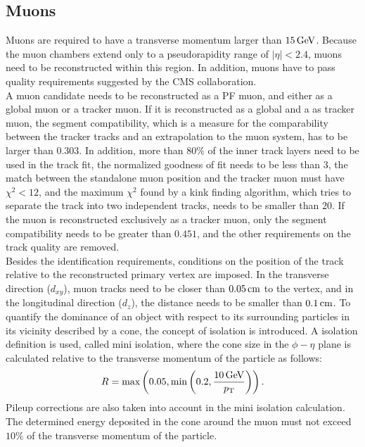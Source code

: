 \subsection{Muons}
Muons are required to have a transverse momentum larger than $15\,\text{Ge\hspace{-.08em}V}$. Because the muon chambers extend only to a pseudorapidity range of $|\eta|<2.4$, muons need to be reconstructed within this region. In addition, muons have to pass quality requirements suggested by the CMS collaboration\cite{MuonIDPerf}.\\
A muon candidate needs to be reconstructed as a PF muon, and either as a global muon or a tracker muon. If it is reconstructed as a global and a as tracker muon, the segment compatibility, which is a measure for the comparability between the tracker tracks and an extrapolation to the muon system, has to be larger than $0.303$. In addition, more than $80\%$ of the inner track layers need to be used in the track fit, the normalized goodness of fit needs to be less than $3$, the match between the standalone muon position and the tracker muon must have $\chi^2<12$, and the maximum $\chi^2$ found by a kink finding algorithm, which tries to separate the track into two independent tracks, needs to be smaller than $20$. If the muon is reconstructed exclusively as a tracker muon, only the segment compatibility needs to be greater than $0.451$, and the other requirements on the track quality are removed.\\
Besides the identification requirements, conditions on the position of the track relative to the reconstructed primary vertex are imposed. In the transverse direction ($d_{xy}$), muon tracks need to be closer than $0.05\,\text{cm}$ to the vertex, and in the longitudinal direction ($d_z$), the distance needs to be smaller than $0.1\,\text{cm}$. To quantify the dominance of an object with respect to its surrounding particles in its vicinity described by a cone, the concept of isolation is introduced. A isolation definition is used, called mini isolation, where the cone size in the $\phi-\eta$ plane is calculated relative to the transverse momentum of the particle as follows:
\begin{equation}
 R = \text{max}\left(0.05,\text{min}\left(0.2,\frac{10\,\text{Ge\hspace{-.08em}V}}{p_{\mathrm{T}}}\right)\right).
\end{equation}
Pileup corrections are also taken into account in the mini isolation calculation.
The determined energy deposited in the cone around the muon must not exceed $10\%$ of the transverse momentum of the particle.


